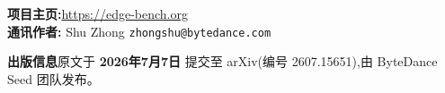 \documentclass[a4paper,11pt]{article}
\theoremstyle{definition}
\begin{document}
\vspace{1em}

\begin{center}
\textbf{项目主页:}\url{https://edge-bench.org}\\[0.3em]
\textbf{通讯作者:} Shu Zhong \quad \texttt{zhongshu@bytedance.com}
\end{center}

\vspace{1em}

\noindent\textbf{出版信息}\quad 原文于 \textbf{2026年7月7日} 提交至 arXiv(编号 2607.15651),由 ByteDance Seed 团队发布。

\vspace{2em}






\end{document}
